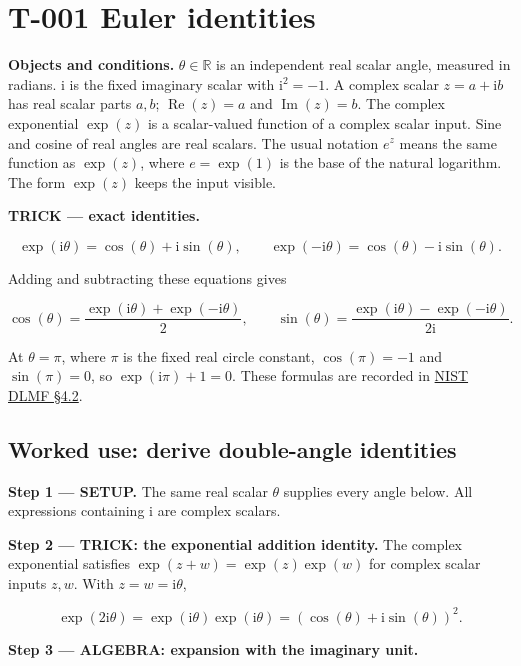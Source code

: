 \documentclass[11pt,oneside,openany]{book}
\begin{document}
\section{T-001 Euler identities}

\textbf{Objects and conditions.} \(\theta\in\mathbb R\) is an independent real scalar
angle, measured in radians. \(\mathrm i\) is the fixed imaginary scalar with
\(\mathrm i^2=-1\). A complex scalar \(z=a+\mathrm i b\) has real scalar parts \(a,b\);
\(\operatorname{Re}(z)=a\) and \(\operatorname{Im}(z)=b\).
The complex exponential \(\exp(z)\) is a scalar-valued function of a complex scalar
input. Sine and cosine of real angles are real scalars.
The usual notation \(e^z\) means the same function as \(\exp(z)\), where
\(e=\exp(1)\) is the base of the natural logarithm. The form \(\exp(z)\) keeps the
input visible.

\textbf{TRICK --- exact identities.}

\[
\exp(\mathrm i\theta)=\cos(\theta)+\mathrm i\sin(\theta),
\qquad
\exp(-\mathrm i\theta)=\cos(\theta)-\mathrm i\sin(\theta).
\]

Adding and subtracting these equations gives

\[
\cos(\theta)=\frac{\exp(\mathrm i\theta)+\exp(-\mathrm i\theta)}{2},
\qquad
\sin(\theta)=\frac{\exp(\mathrm i\theta)-\exp(-\mathrm i\theta)}{2\mathrm i}.
\]

At \(\theta=\pi\), where \(\pi\) is the fixed real circle constant,
\(\cos(\pi)=-1\) and \(\sin(\pi)=0\), so \(\exp(\mathrm i\pi)+1=0\).
These formulas are recorded in \href{https://dlmf.nist.gov/4.2}{NIST DLMF §4.2}.

\subsection{Worked use: derive double-angle identities}

\textbf{Step 1 --- SETUP.} The same real scalar \(\theta\) supplies every angle below.
All expressions containing \(\mathrm i\) are complex scalars.

\begingroup\color{TrickPurple}
\textbf{Step 2 --- TRICK: the exponential addition identity.} The complex
exponential satisfies \(\exp(z+w)=\exp(z)\exp(w)\) for complex scalar inputs \(z,w\).
With \(z=w=\mathrm i\theta\),

\[
\exp(2\mathrm i\theta)
=\exp(\mathrm i\theta)\exp(\mathrm i\theta)
=\left(\cos(\theta)+\mathrm i\sin(\theta)\right)^2.
\]

\endgroup
\begingroup\color{TrickPurple}
\textbf{Step 3 --- ALGEBRA: expansion with the imaginary unit.}
\end{document}
